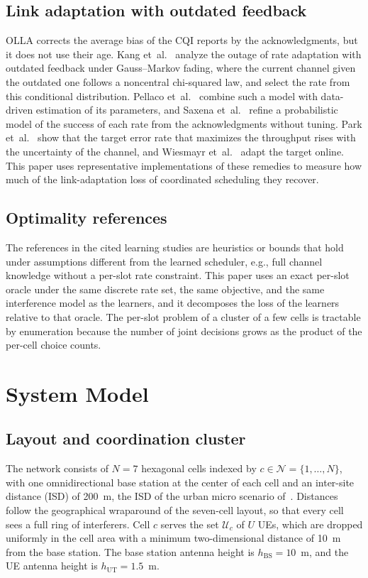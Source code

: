 \documentclass{ieeeaccess}
\begin{document}
\subsection{Link adaptation with outdated feedback}
OLLA corrects the average bias of the CQI reports by the acknowledgments, but it does not use their age. Kang et~al.~\cite{kang2014outdated} analyze the outage of rate adaptation with outdated feedback under Gauss--Markov fading, where the current channel given the outdated one follows a noncentral chi-squared law, and select the rate from this conditional distribution. Pellaco et~al.~\cite{pellaco2020outdated} combine such a model with data-driven estimation of its parameters, and Saxena et~al.~\cite{saxena2022ltsla} refine a probabilistic model of the success of each rate from the acknowledgments without tuning. Park et~al.~\cite{park2015target} show that the target error rate that maximizes the throughput rises with the uncertainty of the channel, and Wiesmayr et~al.~\cite{wiesmayr2025salad} adapt the target online. This paper uses representative implementations of these remedies to measure how much of the link-adaptation loss of coordinated scheduling they recover.

\subsection{Optimality references}
The references in the cited learning studies are heuristics or bounds that hold under assumptions different from the learned scheduler, e.g., full channel knowledge without a per-slot rate constraint. This paper uses an exact per-slot oracle under the same discrete rate set, the same objective, and the same interference model as the learners, and it decomposes the loss of the learners relative to that oracle. The per-slot problem of a cluster of a few cells is tractable by enumeration because the number of joint decisions grows as the product of the per-cell choice counts.

\section{System Model}
\label{sec:system}
\subsection{Layout and coordination cluster}
The network consists of $N = 7$ hexagonal cells indexed by $c \in \mathcal{N} = \{1, \dots, N\}$, with one omnidirectional base station at the center of each cell and an inter-site distance (ISD) of 200~m, the ISD of the urban micro scenario of~\cite{3gpp38901}. Distances follow the geographical wraparound of the seven-cell layout, so that every cell sees a full ring of interferers. Cell $c$ serves the set $\mathcal{U}_c$ of $U$ UEs, which are dropped uniformly in the cell area with a minimum two-dimensional distance of 10~m from the base station. The base station antenna height is $h_{\text{BS}} = 10$~m, and the UE antenna height is $h_{\text{UT}} = 1.5$~m.
\end{document}
